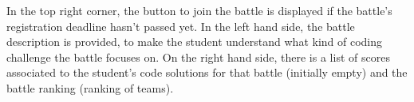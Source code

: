 In the top right corner, the button to join the battle is displayed if the battle's registration deadline hasn't passed yet. 
In the left hand side, the battle description is provided, to make the student understand what kind of coding challenge the battle focuses on. On the right hand side, there is a list of scores associated to the student's code solutions for that battle (initially empty) and the battle ranking (ranking of teams).
